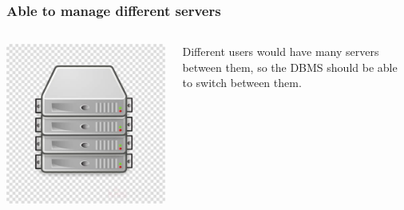 \documentclass{beamer}
\begin{document}
\begin{frame}
	\frametitle{Able to manage different servers}
	\begin{columns}
	\begin{column}{0.4\textwidth}
	\includegraphics[width=\columnwidth]{serverimage.jpg}
			\end{column}
	\begin{column}{0.4\textwidth}
	Different users would have many servers between them, so the DBMS should be able to switch between them.	
	\end{column}

	\end{columns}

	
\end{frame}
\end{document}
